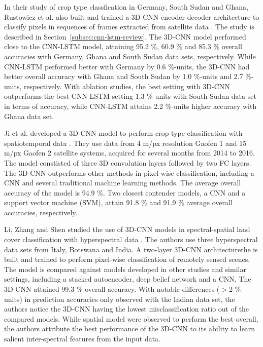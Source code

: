 In their study of crop type classfication in Germany, South Sudan and Ghana, Rustowicz et al. also built and trained a 3D-CNN encoder-decoder architecture to classify pixels in sequences of frames extracted from satellite data \cite{Rustowicz2019}. The study is described in Section~\ref{subsec:cnn-lstm-review}. The 3D-CNN model performed close to the CNN-LSTM model, attaining 95.2 \%, 60.9 \% and 85.3 \% overall accuracies with Germany, Ghana and South Sudan data sets, respectively. While CNN-LSTM performed better with Germany by 0.6 \%-units, the 3D-CNN had better overall accuracy with Ghana and South Sudan by 1.0 \%-units and 2.7 \%-units, respectively. With ablation studies, the best setting with 3D-CNN outperforms the best CNN-LSTM setting 1.3 \%-units with South Sudan data set in terms of accuracy, while CNN-LSTM attains 2.2 \%-units higher accuracy with Ghana data set. 

Ji et al. developed a 3D-CNN model to perform crop type classification with spatiotemporal data \cite{Ji2018}. They use data from 4 m/px resolution Gaofen 1 and 15 m/px Gaofen 2 satellite systems, acquired for several months from 2014 to 2016. The model constisted of three 3D convolution layers followed by two FC layers. The 3D-CNN outperforms other methods in pixel-wise classification, including a CNN and several traditional machine learning methods. The average overall accuracy of the model is 94.9 \%. Two closest contender models, a CNN and a support vector machine (SVM), attain 91.8 \% and 91.9 \% average overall accuracies, respectively. 

Li, Zhang and Shen studied the use of 3D-CNN models in spectral-spatial land cover classification with hyperspectral data \cite{Li2017}. The authors use three hyperspectral data sets from Italy, Botswana and India. A two-layer 3D-CNN architecturethe is built and trained to perform pixel-wise classification of remotely sensed scenes. The model is compared against models developed in other studies and similar settings, including a stacked autoencoder, deep belief network and a CNN. The 3D-CNN attained 99.3 \% overall accuracy. With notable differences ($>$2 \%-units) in prediction accuracies only observed with the Indian data set, the authors notice the 3D-CNN having the lowest misclassification ratio out of the compared models. While spatial model were observed to perform the best overall, the authors attribute the best performance of the 3D-CNN to its ability to learn salient inter-spectral features from the input data.